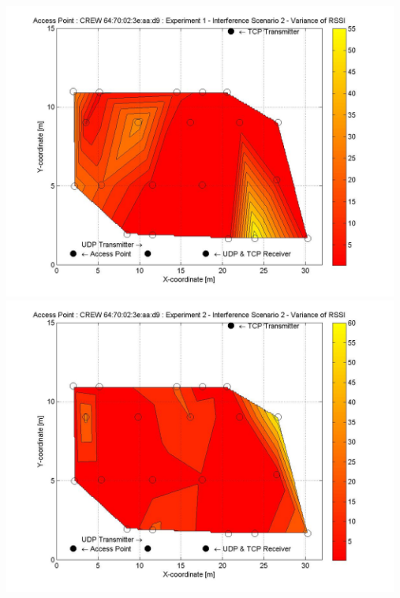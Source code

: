 \documentclass[11pt,a4paper,headinclude,footinclude,chapterprefix=on]{scrreprt}
\begin{document}
\begin{longtable}
	\includegraphics[width=13cm]{../../Source/plot/CREW_d9/d9_Wifi_Ex_1_Variance.jpg} \\
	\includegraphics[width=13cm]{../../Source/plot/CREW_d9/d9_Wifi_Ex_2_Variance.jpg} \\
\end{longtable}
\end{document}

